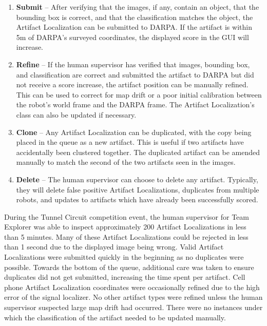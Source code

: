 \begin{enumerate}
	\item \textbf{Submit} -- After verifying that the images, if any, contain an object, that the bounding box is correct, and that the classification matches the object, the Artifact Localization can be submitted to DARPA. If the artifact is within 5m of DARPA's surveyed coordinates, the displayed score in the GUI will increase.
	\item \textbf{Refine} -- If the human supervisor has verified that images, bounding box, and classification are correct and submitted the artifact to DARPA but did not receive a score increase, the artifact position can be manually refined. This can be used to correct for map drift or a poor initial calibration between the robot's world frame and the DARPA frame. The Artifact Localization's class can also be updated if necessary.
	\item \textbf{Clone} -- Any Artifact Localization can be duplicated, with the copy being placed in the queue as a new artifact. This is useful if two artifacts have accidentally been clustered together. The duplicated artifact can be amended manually to match the second of the two artifacts seen in the images.
	\item \textbf{Delete} -- The human supervisor can choose to delete any artifact. Typically, they will delete false positive Artifact Localizations, duplicates from multiple robots, and updates to artifacts which have already been successfully scored.
\end{enumerate}

During the Tunnel Circuit competition event, the human supervisor for Team Explorer was able to inspect approximately 200 Artifact Localizations in less than 5 minutes. Many of these Artifact Localizations could be rejected in less than 1 second due to the displayed image being wrong. Valid Artifact Localizations were submitted quickly in the beginning as no duplicates were possible. Towards the bottom of the queue, additional care was taken to ensure duplicates did not get submitted, increasing the time spent per artifact. Cell phone Artifact Localization coordinates were occasionally refined due to the high error of the signal localizer. No other artifact types were refined unless the human supervisor suspected large map drift had occurred. There were no instances under which the classification of the artifact needed to be updated manually.